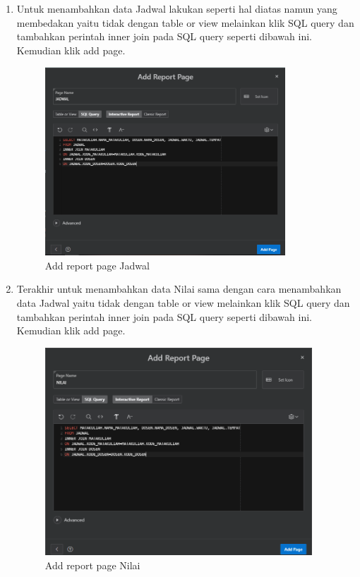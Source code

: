 \begin{enumerate}
    \item Untuk menambahkan data Jadwal lakukan seperti hal diatas namun yang membedakan yaitu tidak dengan table or view melainkan klik SQL query dan tambahkan perintah inner join pada SQL query seperti dibawah ini. Kemudian klik add page.
        \begin{figure}[!htbp]
        \centering
        \includegraphics[width=9cm]{figures/11.PNG}
        \caption{Add report page Jadwal}
    \end{figure}
    
    \item Terakhir untuk menambahkan data Nilai sama dengan cara menambahkan data Jadwal yaitu tidak dengan table or view melainkan klik SQL query dan tambahkan perintah inner join pada SQL query seperti dibawah ini. Kemudian klik add page.
        \begin{figure}[!htbp]
        \centering
        \includegraphics[width=10cm]{figures/12.PNG}
        \caption{Add report page Nilai}
    \end{figure}
    

\end{enumerate}
